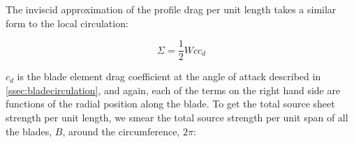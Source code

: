 \begin{assumption}
    \label{asm:rotorsources}




\end{assumption}

%         
%         

The inviscid approximation of the profile drag per unit length takes a similar form to the local circulation:

\begin{equation}
     \Sigma = \frac{1}{2} W c c_d
\end{equation}

\where \(c_d\) is the blade element drag coefficient at the angle of attack described in \cref{ssec:bladecirculation}, and again, each of the terms on the right hand side are functions of the radial position along the blade.
%
To get the total source sheet strength per unit length, we smear the total source strength per unit span of all the blades, \(B\), around the circumference, \(2\pi \):

